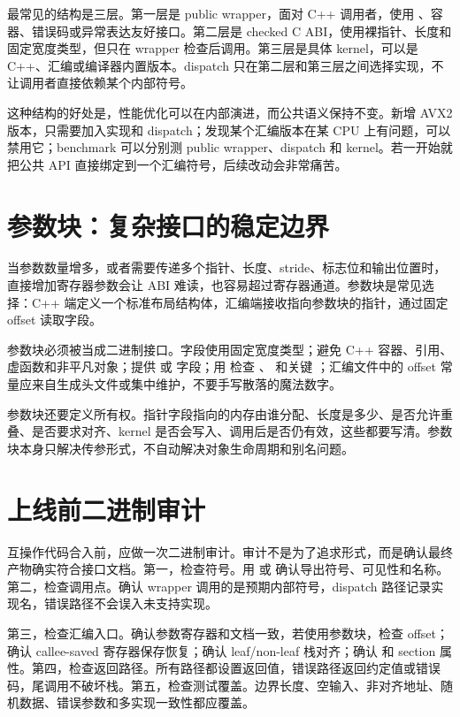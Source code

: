 最常见的结构是三层。第一层是 public wrapper，面对 C++ 调用者，使用 、容器、错误码或异常表达友好接口。第二层是 checked C ABI，使用裸指针、长度和固定宽度类型，但只在 wrapper 检查后调用。第三层是具体 kernel，可以是 C++、汇编或编译器内置版本。dispatch 只在第二层和第三层之间选择实现，不让调用者直接依赖某个内部符号。

这种结构的好处是，性能优化可以在内部演进，而公共语义保持不变。新增 AVX2 版本，只需要加入实现和 dispatch；发现某个汇编版本在某 CPU 上有问题，可以禁用它；benchmark 可以分别测 public wrapper、dispatch 和 kernel。若一开始就把公共 API 直接绑定到一个汇编符号，后续改动会非常痛苦。

\section{参数块：复杂接口的稳定边界}

当参数数量增多，或者需要传递多个指针、长度、stride、标志位和输出位置时，直接增加寄存器参数会让 ABI 难读，也容易超过寄存器通道。参数块是常见选择：C++ 端定义一个标准布局结构体，汇编端接收指向参数块的指针，通过固定 offset 读取字段。

参数块必须被当成二进制接口。字段使用固定宽度类型；避免 C++ 容器、引用、虚函数和非平凡对象；提供  或  字段；用  检查 、 和关键 ；汇编文件中的 offset 常量应来自生成头文件或集中维护，不要手写散落的魔法数字。

参数块还要定义所有权。指针字段指向的内存由谁分配、长度是多少、是否允许重叠、是否要求对齐、kernel 是否会写入、调用后是否仍有效，这些都要写清。参数块本身只解决传参形式，不自动解决对象生命周期和别名问题。

\section{上线前二进制审计}

互操作代码合入前，应做一次二进制审计。审计不是为了追求形式，而是确认最终产物确实符合接口文档。第一，检查符号。用  或  确认导出符号、可见性和名称。第二，检查调用点。确认 wrapper 调用的是预期内部符号，dispatch 路径记录实现名，错误路径不会误入未支持实现。

第三，检查汇编入口。确认参数寄存器和文档一致，若使用参数块，检查 offset；确认 callee-saved 寄存器保存恢复；确认 leaf/non-leaf 栈对齐；确认  和 section 属性。第四，检查返回路径。所有路径都设置返回值，错误路径返回约定值或错误码，尾调用不破坏栈。第五，检查测试覆盖。边界长度、空输入、非对齐地址、随机数据、错误参数和多实现一致性都应覆盖。


